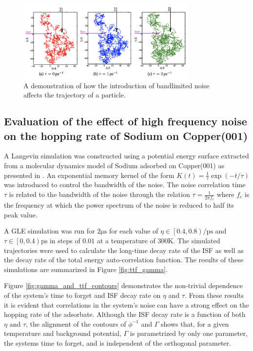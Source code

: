 \documentclass{article}
\newcommand{\ps}{\si{\pico\second}}
\newcommand{\ips}{\si{\per\pico\second}}
\newcommand{\us}{\si{\micro\second}}
\newcommand{\K}{\si{\kelvin}}
\begin{document}
\begin{figure}
	\centering
	\includegraphics[width=0.8\textwidth]{noise_trajectories}
	\caption{A demonstration of how the introduction of bandlimited noise affects the trajectory of a particle.}
	\label{fig:noise_trajectories}
\end{figure}

\subsection{Evaluation of the effect of high frequency noise on the hopping rate of Sodium on Copper(001)} \label{sec:hopping_simulations}

A Langevin simulation was constructed using a potential energy surface extracted from a molecular dynamics model of Sodium adsorbed on Copper(001) as presented in \cite{Gil}. An exponential memory kernel of the form $K(t) = \frac{1}{\tau}\exp(-t/\tau)$ was introduced to control the bandwidth of the noise. The noise correlation time $\tau$ is related to the bandwidth of the noise through the relation $\tau = \frac{1}{2 \pi f_c}$ where $f_c$ is the frequency at which the power spectrum of the noise is reduced to half its peak value. 

A GLE simulation was run for $2\us$ for each value of $\eta\in\left[0.4, 0.8\right)\ips$ and $\tau\in\left[0, 0.4\right)\ps$ in steps of $0.01$ at a temperature of $300\K$. The simulated trajectories were used to calculate the long-time decay rate of the ISF as well as the decay rate of the total energy auto-correlation function. The results of these simulations are summarized in Figure \ref{fig:ttf_gamma}.

Figure \ref{fig:gamma_and_ttf_contours} demonstrates the non-trivial dependence of the system's time to forget and ISF decay rate on $\eta$ and $\tau$. From these results it is evident that correlations in the system's noise can have a strong effect on the hopping rate of the adsorbate. Although the ISF decay rate is a function of both $\eta$ and $\tau$, the alignment of the contours of $\phi^{-1}$ and $\Gamma$ shows that, for a given temperature and background potential, $\Gamma$ is parametrized by only one parameter, the systems time to forget, and is independent of the orthogonal parameter.
\end{document}
